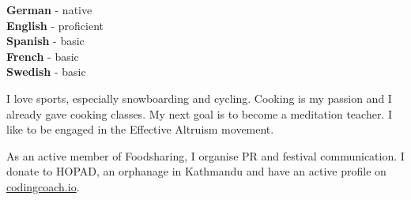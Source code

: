 \documentclass[9pt]{developercv} %
\begin{document}

\begin{minipage}[t]{0.3\textwidth}
	\vspace{-\baselineskip} %

	
	\textbf{German} - native\\
	\textbf{English} - proficient\\
	\textbf{Spanish} - basic\\
	\textbf{French} - basic\\
	\textbf{Swedish} - basic
\end{minipage}
\hfill
\begin{minipage}[t]{0.3\textwidth}
	\vspace{-\baselineskip} %
	
	
  I love sports, especially snowboarding and cycling. Cooking is my passion and I already gave cooking classes. My next
  goal is to become a meditation teacher. I like to be engaged in the Effective Altruism movement.
\end{minipage}
\hfill
\begin{minipage}[t]{0.3\textwidth}
	\vspace{-\baselineskip} %
	
  
  As an active member of Foodsharing, I organise PR and festival communication. I donate to HOPAD, an orphanage in Kathmandu
  and have an active profile on \href{https://mentors.codingcoach.io/}{codingcoach.io}.
\end{minipage}



\end{document}
